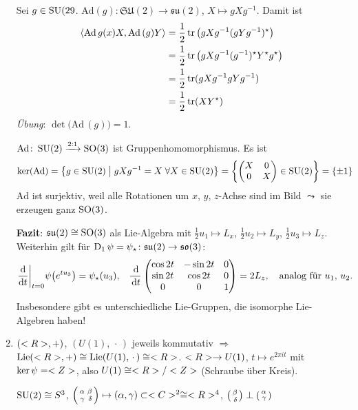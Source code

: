 \begin{example}
\begin{enumerate}[label={(\arabic*)}]
		Sei $g\in\operatorname{SU}(29$. $\mathrm{Ad}(g)\colon\mathfrak{SU}(2)\to\mathfrak{su}(2)$, $X\mapsto gXg^{-1}$. Damit ist \begin{align*}
			\langle \mathrm{Ad}\,g(x)X,\mathrm{Ad}\,(g)Y\rangle &= \frac12\operatorname{tr}\big(gXg^{-1}(gYg^{-1})^\star\big) \\
			&=\frac12\operatorname{tr}\big(gXg^{-1}(g^{-1})^\star Y^\star g^\star\big) \\
			&= \frac12\operatorname{tr}(gXg^{-1}gYg^{-1})\\
			&=\frac12\operatorname{tr}(XY^\star)
		\end{align*}
		\emph{Übung}: $\det\big(\mathrm{Ad}\,(g)\big) = 1$.
		
		$\mathrm{Ad}\colon \operatorname{SU}(2)\xrightarrow{2:1} \operatorname{SO}(3)$ ist Gruppenhomomorphismus. Es ist \begin{align*}
			\ker(\mathrm{Ad}) &= \big\{ g\in\operatorname{SU}(2)\;\big|\; gXg^{-1} = X\;\forall X\in\operatorname{SU}(2) \big\}= \left\lbrace \begin{pmatrix}
				X & 0\\0&X
			\end{pmatrix}\in\operatorname{SU}(2)\right\rbrace = \{\pm 1\}
		\end{align*}
		$\mathrm{Ad}$ ist surjektiv, weil alle Rotationen um $x$, $y$, $z$-Achse sind im Bild $\leadsto$ sie erzeugen ganz $\operatorname{SO}(3)$.
		
		\textbf{Fazit}: $\mathfrak{su}(2)\cong\operatorname{SO}(3)$ als Lie-Algebra mit $\frac12 u_1\mapsto L_x$, $\frac12 u_2\mapsto L_y$, $\frac12 u_3\mapsto L_z$. Weiterhin gilt für $\operatorname{D}_1\psi =\psi_\star\colon\mathfrak{su}(2)\to\mathfrak{so}(3)$: \begin{align*}
			\frac{\mathrm d}{\mathrm dt}\bigg|_{t=0} \psi\big(e^{tu_3}\big) &= \psi_\star(u_3), & \frac{\,\mathrm{d}}{\,\mathrm{d} t}\begin{pmatrix}
				\cos 2t & -\sin 2t & 0 \\ \sin 2t & \cos 2t & 0 \\ 0 & 0 & 1
			\end{pmatrix} &= 2L_z,\quad\text{analog für $u_1$, $u_2$.}
		\end{align*}
		Insbesondere gibt es unterschiedliche Lie-Gruppen, die isomorphe Lie-Algebren haben!
		\item $(<R>,+)$, $(U(1),\,\cdot\,)$ jeweils kommutativ $\Rightarrow$ $\operatorname{Lie}(<R>,+)\cong\operatorname{Lie}(U(1),\,\cdot\,)\cong<R>$. $<R>\to U(1)$, $t\mapsto e^{2\pi it}$ mit $\ker\psi =<Z>$, also $U(1)\cong <R>\slash <Z>$ (Schraube über Kreis).
		
		$\operatorname{SU}(2)\cong S^3$, $\begin{psmallmatrix*}[r]
			\alpha & \beta \\ \gamma & \delta
		\end{psmallmatrix*}\mapsto (\alpha,\gamma)\subset\C^2\cong\R^4$, $\begin{psmallmatrix*}[r]
			\beta\\\delta
		\end{psmallmatrix*}\perp\begin{psmallmatrix*}[r]
			\alpha\\\gamma
		\end{psmallmatrix*}$
		

\end{enumerate}
\end{example}
